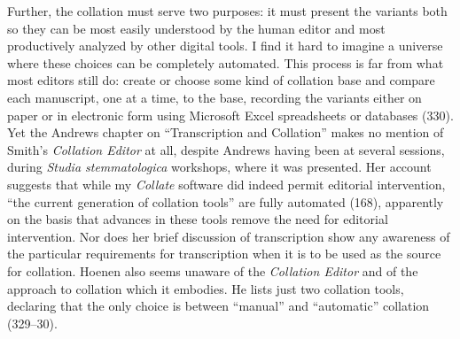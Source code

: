\documentclass{article}
\begin{document}
Further, the collation must serve two purposes: it must present
the variants both so they can be most easily understood by the human
editor and most productively analyzed by other digital tools. I find it
hard to imagine a universe where these choices can be completely
automated. This process is far from what most editors still do: create
or choose some kind of collation base and compare each manuscript, one
at a time, to the base, recording the variants either on paper or in
electronic form using Microsoft Excel spreadsheets or databases (330).
Yet the Andrews chapter on ``Transcription and Collation'' makes no
mention of Smith's \emph{Collation Editor} at all, despite Andrews
having been at several sessions, during \emph{Studia stemmatologica}
workshops, where it was presented. Her account suggests that while my
\emph{Collate} software did indeed permit editorial intervention, ``the
current generation of collation tools'' are fully automated (168),
apparently on the basis that advances in these tools remove the need for
editorial intervention. Nor does her brief discussion of transcription
show any awareness of the particular requirements for transcription when
it is to be used as the source for collation. Hoenen also seems unaware
of the \emph{Collation Editor} and of the approach to collation which it
embodies. He lists just two collation tools, declaring that the only
choice is between ``manual'' and ``automatic'' collation (329--30).
\end{document}
